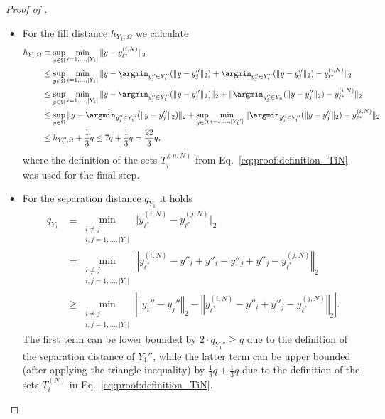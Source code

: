 \documentclass[a4paper, 10pt]{article}
\begin{document}
\begin{proof}[Proof of ]
\begin{itemize}
\item For the fill distance $h_{Y_1, \Omega}$ we calculate
\begin{align}
\label{eq:proof:subset_upper_bound_fill_dist}
h_{Y_1, \Omega} &\equiv \sup_{y \in \Omega} \min_{i=1, ..., |Y_1|} \Vert y - y_{\ell^*}^{(i, N)} \Vert_2 \notag \\
&\leq \sup_{y \in \Omega} \min_{i=1, ..., |Y_1|} \Vert y - \argmin_{y_j'' \in Y_1''}(\Vert y - y_j'' \Vert_2) + \argmin_{y_j'' \in Y_1''}(\Vert y - y_j'' \Vert_2) - y_{\ell^*}^{(i,N)} \Vert_2 \notag \\
&\leq \sup_{y \in \Omega} \min_{i=1, ..., |Y_1|} \Vert y - \argmin_{y_j'' \in Y_1''}(\Vert y - y_j'' \Vert_2) \Vert_2 + \Vert \argmin_{y_j'' \in Y_n}(\Vert y - y_j'' \Vert_2) - y_{\ell^*}^{(i,N)} \Vert_2 \notag \\
&\leq \sup_{y \in \Omega} \Vert y - \argmin_{y_j'' \in Y_1''}(\Vert y - y_j'' \Vert_2) \Vert_2 + \sup_{y \in \Omega} \min_{i=1, ..., |Y_1''|} \Vert \argmin_{y_j'' \in Y_1''}(\Vert y - y_j'' \Vert_2) - y_{\ell^*}^{(i,N)} \Vert_2 \notag \\
&\leq h_{Y_1'', \Omega} + \frac{1}{3} q 
\leq 7q + \frac{1}{3}q = \frac{22}{3}q,
\end{align}
where the definition of the sets $T_i^{(n, N)}$ from Eq.\ \eqref{eq:proof:definition_TiN} was used for the final step.
%
%
%
%
%
\item For the separation distance $q_{Y_1}$ it holds
\begin{align*}
q_{Y_1} &\equiv \min_{\substack{i \neq j \\ i, j = 1, ..., |Y_1|}} \Vert y_{\ell^*}^{(i,N)} - y_{\ell^*}^{(j,N)} \Vert_2 \\
&= \min_{\substack{i \neq j \\ i, j = 1, ..., |Y_1|}} \left \Vert y_{\ell^*}^{(i,N)} - y''_i + y''_i - y''_j + y''_j - y_{\ell^*}^{(j,N)} \right \Vert_2 \\
&\geq \min_{\substack{i \neq j \\ i, j = 1, ..., |Y_1|}} \left| \left \Vert y_i'' - y_j'' \right \Vert_2 - \left \Vert y_{\ell^*}^{(i,N)} - y''_i + y''_j - y_{\ell^*}^{(j,N)} \right \Vert_2 \right|.
\end{align*}
The first term can be lower bounded by $2 \cdot q_{Y_1''} \geq q$ due to the definition of the separation distance of $Y_1''$, 
while the latter term can be upper bounded (after applying the triangle inequality) by $\frac{1}{3} q + \frac{1}{3} q$ due to the definition of the sets $T_i^{(N)}$ in Eq.\ \eqref{eq:proof:definition_TiN}.

\end{itemize}
\end{proof}
\end{document}
